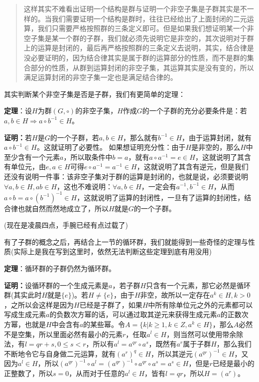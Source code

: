\documentclass[12pt, a4paper, oneside]{ctexart}
\newenvironment{myquote}{\begin{quote}\small\color{gray}}{\end{quote}}
\begin{document}
\begin{myquote}
这样其实不难看出证明一个结构是群与证明一个非空子集是子群其实是不一样的。当我们需要证明一个结构是群时，往往已经给出了上面封闭的二元运算，我们只需要严格按照群的三条定义即可。但是如果我们想证明某一个非空子集是某一个群的子群，我们就必须先说明它是非空的，其次说明对于群上的运算是封闭的，最后再严格按照群的三条定义去说明，其实，结合律是没必要证明的，因为结合律其实是属于群的运算部分的性质，而不是群的集合部分的性质，从群到运算封闭的非空子集，其运算其实是没有变的，所以满足运算封闭的非空子集一定也是满足结合律的。
\end{myquote}

其实判断某个非空子集是否是子群，我们有更简单的定理：

\textbf{定理}：设$H$为群$(G,\circ)$的非空子集，$H$作成$G$的一个子群的充分必要条件是：若$a,b\in H\Rightarrow a\circ b^{-1}\in H$。

\textbf{证明：}若$H$是$G$的一个子群，若$a,b\in H$，那么就有$b^{-1}\in H$，由于运算封闭，就有$a\circ b^{-1}\in H$。这就证明了必要性。
如果想证明充分性：由于$H$是非空的，那么$H$中至少含有一个元素$a$，所以取条件中$b=a$，就有$a\circ a^{-1}=e\in H$，这就说明了其含有单位元，由$e,a\in H$可得$e\circ a^{-1}=a^{-1}\in H$，这就说明了其含有逆元，但是我们还没有说明一件事：该非空子集对于群的运算是封闭的，也就是说，必须要说明$\forall a,b\in H,ab\in H$，这也不难说明：$\forall a,b\in H$，一定会有$a^{-1},b^{-1}\in H$，从而$a\circ b=a\circ (b^{-1})^{-1}\in H$，这就说明了运算的封闭性，一旦有了运算的封闭性，结合律也就自然而然地成立了，所以$H$就是$G$的一个子群。

(现在是凌晨四点，手腕已经有点过载了)

有了子群的概念之后，再结合上一节的循环群，我们就能得到一些奇怪的定理与性质(实际上是我在写到这里时，依然无法判断这些定理到底有用没用)

\textbf{定理}：循环群的子群仍然为循环群。

\textbf{证明：}设循环群的一个生成元素是$a$，若子群$H$只含有一个元素，那它必然是循环群(其实此时$H$就是$\{e\}$)。若$H\neq\{e\}$，由于$H$非空，故所以一定存在$a^k\in H,k>0$，之所以会这样是因为$H$已经是子群了，如果$H$中所有除单位元之外的元素都可以写成生成元素$a$的负数次方幂的话，可以通过取其逆元来获得生成元素$a$的正数次方幂，也就是$H$中会含有$a$的某些幂。令$A=\{k|k\geqslant1,k\in Z,a^k\in H\}$，那么$A$必然不是空集，所以里面必然有最小的元素$r$，任取$a^l\in H$，则当然可以使用带余除法，有$l=qr+s,0\leqslant s<r$，所以有$a^l=a^{qr}\circ a^s$，既然有$a^r$属于子群$H$，那么我们不断地令它与自身做二元运算，就有$(a^r)^q\in H$，所以其逆元$(a^{qr})^{-1}\in H$，又因为$a^l\in H$，所以$(a^{qr})^{-1}\circ a^l=(a^{qr})^{-1}\circ a^{qr}\circ a^s=a^s\in H$，但是$r$已经是最小的正整数了，所以$s=0$，从而对于任意的$a^l\in H$，皆有$l=qr$，所以$H=(a^r)$。
\end{document}
